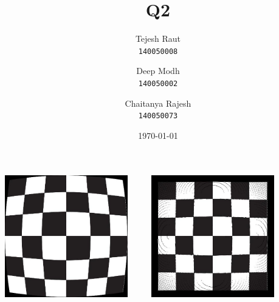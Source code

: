 \documentclass{article}
\title{Q2}
\date{\today}
\author{
	Tejesh Raut\\
	\texttt{140050008}
	\and
	Deep Modh\\
	\texttt{140050002}
	\and
	Chaitanya Rajesh\\
	\texttt{140050073}
}
\begin{document}
	\maketitle
	\includegraphics[width=0.4\textwidth]{../input/rad_checkerbox.jpg} \ \ \ \ \ 
	\includegraphics[width=0.4\textwidth]{../output/checkerbox.jpg}
\end{document}
